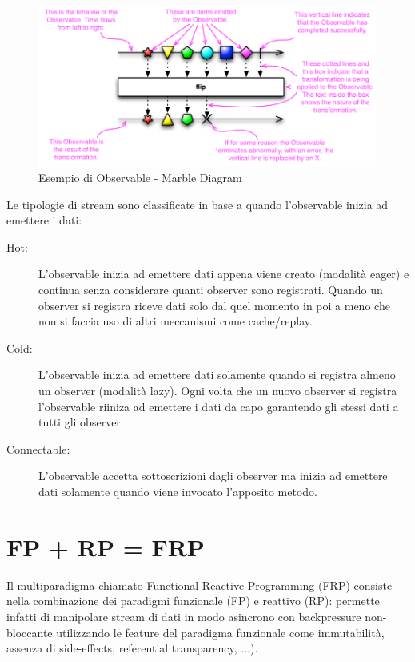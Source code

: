 \documentclass[../main.tex]{subfiles}
\begin{document}
\begin{figure}[H]
\centering
\includegraphics[width=1\textwidth]{img/observable1.png}
\caption{Esempio di Observable - Marble Diagram}
\end{figure}

Le tipologie di stream sono classificate in base a quando l'observable inizia ad emettere i dati:
\begin{description}
    \item[Hot:] L'observable inizia ad emettere dati appena viene creato (modalità eager) e continua senza considerare quanti observer sono registrati. Quando un observer si registra riceve dati solo dal quel momento in poi a meno che non si faccia uso di altri meccanismi come cache/replay.
    \item[Cold:] L'observable inizia ad emettere dati solamente quando si registra almeno un observer (modalità lazy). Ogni volta che un nuovo observer si registra l'observable riiniza ad emettere i dati da capo garantendo gli stessi dati a tutti gli observer.
    \item[Connectable:] L'observable accetta sottoscrizioni dagli observer ma inizia ad emettere dati solamente quando viene invocato l'apposito metodo.
\end{description}

\section{FP + RP = FRP}
Il multiparadigma chiamato Functional Reactive Programming (FRP) consiste nella combinazione dei paradigmi funzionale (FP) e reattivo (RP): permette infatti di manipolare stream di dati in modo asincrono con backpressure non-bloccante utilizzando le feature del paradigma funzionale come immutabilità, assenza di side-effects, referential transparency, ...).
\end{document}
